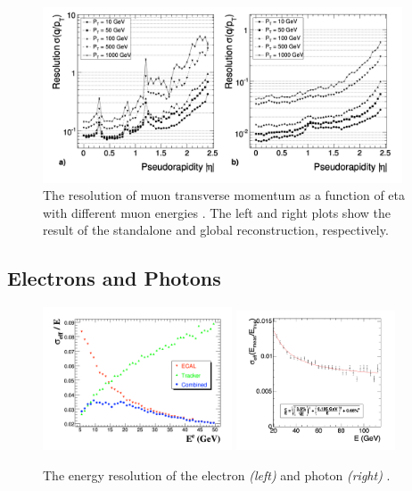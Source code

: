 \begin{figure}[ht]
    \centering
    \includegraphics[width=0.95\textwidth]{chapters/CMSExperiment/sectionReconstruction/figures/resMu.png}
    \caption{The resolution of muon transverse momentum as a function of eta with different muon energies \cite{cms:tdr1:Bayatian:2006nff} . The left and right plots show the result of the standalone and global reconstruction, respectively.}
    \label{fig:cmsExperiment:reconstruction:resMu}
\end{figure}





\subsection{Electrons and Photons}
\label{sec:cmsExperiment:reconstruction:egamma}


\begin{figure}[ht]
    \centering
    \includegraphics[width=0.5\textwidth]{chapters/CMSExperiment/sectionReconstruction/figures/resEle.png}
    \includegraphics[width=0.42\textwidth]{chapters/CMSExperiment/sectionReconstruction/figures/resGamma.png}
    \caption{The energy resolution of the electron \emph{(left)} and photon \emph{(right)} \cite{cms:tdr1:Bayatian:2006nff}.  }
    \label{fig:cmsExperiment:reconstruction:resEle}
\end{figure}


